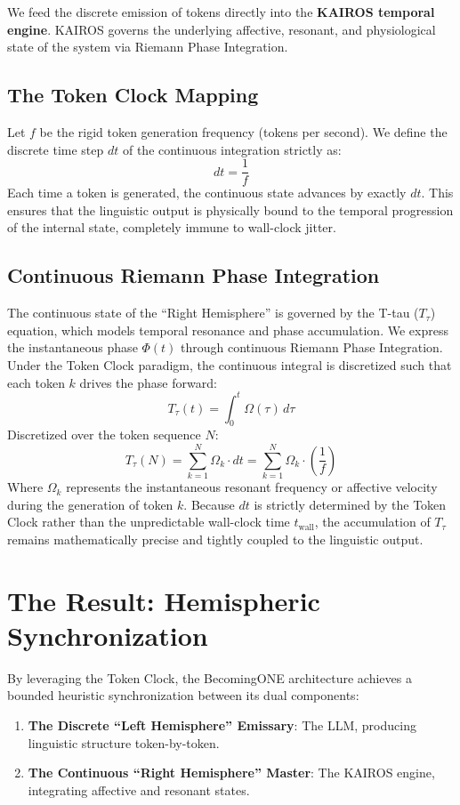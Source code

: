 \documentclass[11pt,a4paper]{article}
\begin{document}
We feed the discrete emission of tokens directly into the \textbf{KAIROS temporal engine}. KAIROS governs the underlying affective, resonant, and physiological state of the system via Riemann Phase Integration.

\subsection{The Token Clock Mapping}
Let $f$ be the rigid token generation frequency (tokens per second). We define the discrete time step $dt$ of the continuous integration strictly as:
\begin{equation}
    dt = \frac{1}{f}
\end{equation}
Each time a token is generated, the continuous state advances by exactly $dt$. This ensures that the linguistic output is physically bound to the temporal progression of the internal state, completely immune to wall-clock jitter.

\subsection{Continuous Riemann Phase Integration}
The continuous state of the ``Right Hemisphere'' is governed by the T-tau ($T_\tau$) equation, which models temporal resonance and phase accumulation. We express the instantaneous phase $\Phi(t)$ through continuous Riemann Phase Integration. Under the Token Clock paradigm, the continuous integral is discretized such that each token $k$ drives the phase forward:
\begin{equation}
    T_\tau(t) = \int_{0}^{t} \Omega(\tau) \, d\tau
\end{equation}
Discretized over the token sequence $N$:
\begin{equation}
    T_\tau(N) = \sum_{k=1}^{N} \Omega_k \cdot dt = \sum_{k=1}^{N} \Omega_k \cdot \left(\frac{1}{f}\right)
\end{equation}
Where $\Omega_k$ represents the instantaneous resonant frequency or affective velocity during the generation of token $k$. Because $dt$ is strictly determined by the Token Clock rather than the unpredictable wall-clock time $t_{\text{wall}}$, the accumulation of $T_\tau$ remains mathematically precise and tightly coupled to the linguistic output.

\section{The Result: Hemispheric Synchronization}
By leveraging the Token Clock, the BecomingONE architecture achieves a bounded heuristic synchronization between its dual components:
\begin{enumerate}
    \item \textbf{The Discrete ``Left Hemisphere'' Emissary}: The LLM, producing linguistic structure token-by-token.
    \item \textbf{The Continuous ``Right Hemisphere'' Master}: The KAIROS engine, integrating affective and resonant states.
\end{enumerate}
\end{document}
